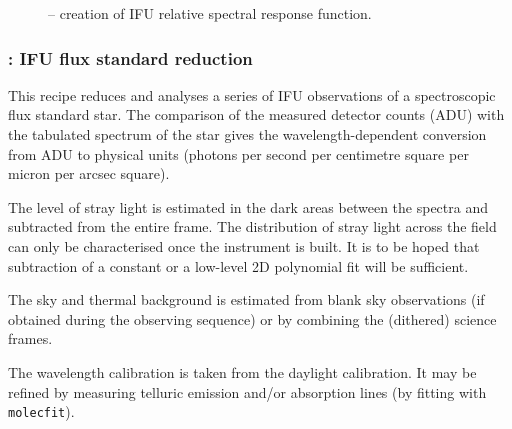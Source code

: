 \begin{figure}[hb]
    \centering
    \def \globalscale {0.700000}
    \fontsize{10}{12}\selectfont
    
  \caption[Recipe: ]{ --
    creation of IFU relative spectral response function.}
  \label{fig:metis_ifu_rsrf}
\end{figure}


\clearpage
\subsubsection{: IFU flux standard reduction}
\label{sssec:ifu_std_process}
\label{rec:metis_ifu_std_process}

This recipe reduces and analyses a series of IFU observations of a
spectroscopic flux standard star. The comparison of the measured
detector counts (ADU) with the tabulated spectrum of the star gives
the wavelength-dependent conversion from ADU to physical units
(photons per second per centimetre square per micron per arcsec square).

The level of stray light is estimated in the dark areas between the
spectra and subtracted from the entire frame. The distribution of
stray light across the field can only be characterised once the
instrument is built. It is to be hoped that subtraction of a constant
or a low-level 2D polynomial fit will be sufficient.

The sky and thermal background is estimated from blank sky
observations (if obtained during the observing sequence) or by
combining the (dithered) science frames.

The wavelength calibration is taken from the daylight calibration. It
may be refined by measuring telluric emission and/or absorption lines
(by fitting with \lstinline{molecfit}).

